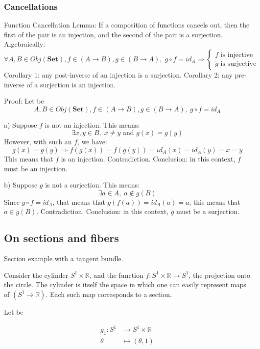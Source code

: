 \documentclass[12pt, letterpaper, twoside]{article}
\begin{document}
\subsubsection{Cancellations}

Function Cancellation Lemma: If a composition of functions cancels out, then the first of the pair is an injection, and the second of the pair is a surjection. Algebraically:
$$
\forall A, B \in Obj(\textbf{Set}),
f \in (A \to B), g \in (B \to A), \;
	g \circ f = id_A
\Rightarrow
	\begin{cases}
		f \text{ is injective} \\
		g \text{ is surjective}
	\end{cases}
$$
Corollary 1: any post-inverse of an injection is a surjection.
Corollary 2: any pre-inverse of a surjection is an injection.

Proof: Let be 
$$A, B \in Obj(\textbf{Set}), f \in (A \to B), g \in (B \to A), \; g \circ f = id_A$$

a) Suppose $f$ is not an injection. This means:
$$\exists x, y \in B, \; x \neq y \text{ and } g(x) = g(y)$$
However, with such an $f$, we have:
$$g(x) = g(y) \Rightarrow f(g(x)) = f(g(y)) = id_A(x) = id_A(y) = x = y$$
This means that $f$ is an injection. Contradiction.
Conclusion: in this context, $f$ must be an injection.

b) Suppose $g$ is not a surjection. This means:
$$\exists a \in A, \; a \notin g(B)$$
Since $g \circ f = id_A$, that means that $g(f(a)) = id_A(a) = a$, this means that $a \in g(B)$. Contradiction.
Conclusion: in this context, $g$ must be a surjection.



\subsection{On sections and fibers}

Section example with a tangent bundle.

Consider the cylinder $S^1 \times \mathbb{R}$, and the function $f : S^1 \times \mathbb{R} \to S^1$, the projection onto the circle. The cylinder is itself the space in which one can easily represent maps of $(S^1 \to \mathbb{R})$. Each such map corresponds to a section.

Let be 

$$
\begin{align*}
g_1 : S^1    & \longrightarrow  S^1 \times \mathbb{R} \\
      \theta & \longmapsto      (\theta, 1)
\end{align*}
$$
\end{document}
